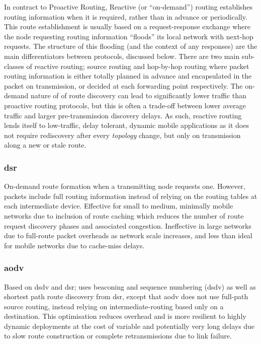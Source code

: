 {In contract to Proactive Routing, Reactive (or ``on-demand'') routing establishes routing information when it is required, rather than in advance or periodically.
This route establishment is usually based on a request-response exchange where the node requesting routing information ``floods'' its local network with next-hop requests.
The structure of this flooding (and the context of any responses) are the main differentiators between protocols, discussed below.
There are two main sub-classes of reactive routing; source routing and hop-by-hop routing where packet routing information is either totally planned in advance and encapsulated in the packet on transmission, or decided at each forwarding point respectively.
The on-demand nature of of route discovery can lead to significantly lower traffic than proactive routing protocols, but this is often a trade-off between lower average traffic and larger pre-transmission discovery delays. 
As such, reactive routing lends itself to low-traffic, delay tolerant, dynamic mobile applications as it does not require rediscovery after every \emph{topology} change, but only on transmission along a new or stale route.

\subsubsection{\gls{dsr}}
On-demand route formation when a transmitting node requests one. However, packets include full routing information instead of relying on the routing tables at each intermediate device\cite{Johnson1996}. Effective for small to medium, minimally mobile networks due to inclusion of route caching which reduces the number of route request discovery phases and associated congestion. Ineffective in large networks due to full-route packet overheads as network scale increases, and less than ideal for mobile networks due to cache-miss delays.\\
\subsubsection{\gls{aodv}}
Based on \gls{dsdv} and \gls{dsr}; uses beaconing and sequence numbering (\gls{dsdv}) as well as shortest path route discovery from \gls{dsr}, except that \gls{aodv} does not use full-path source routing, instead relying on intermediate-routing based only on a destination. This optimisation reduces overhead and is more resilient to highly dynamic deployments at the cost of variable and potentially very long delays due to slow route construction or complete retransmissions due to link failure.\cite{Rai2010a}  \\
}
